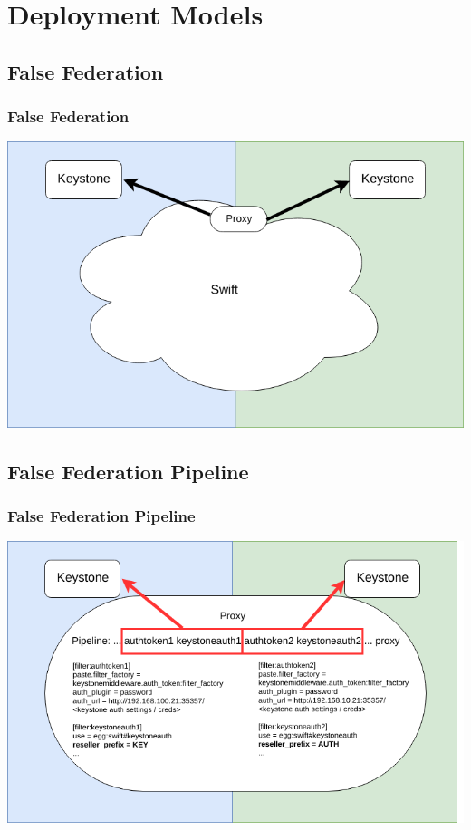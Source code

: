 \documentclass[aspectratio=169,11pt,hyperref={colorlinks=true}]{beamer}
\begin{document}
\section{Deployment Models}

\subsection{False Federation}
\begin{frame}
\frametitle{False Federation}
\centering
\includegraphics[width=.775\textwidth]{swift-federation-false.png}
\end{frame}

\subsection{False Federation Pipeline}
\begin{frame}
\frametitle{False Federation Pipeline}
\centering
\includegraphics[width=.775\textwidth]{swift-federation-false-pipeline.png}
\end{frame}
\end{document}
